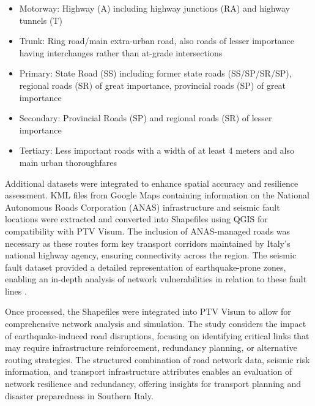 \begin{itemize}
    \item Motorway: Highway (A) including highway junctions (RA) and highway tunnels (T)
    \item Trunk: Ring road/main extra-urban road, also roads of lesser importance having interchanges rather than at-grade intersections
    \item Primary: State Road (SS) including former state roads (SS/SP/SR/SP), regional roads (SR) of great importance, provincial roads (SP) of great importance
    \item Secondary: Provincial Roads (SP) and regional roads (SR) of lesser importance
    \item Tertiary: Less important roads with a width of at least 4 meters and also main urban thoroughfares  
\end{itemize}

Additional datasets were integrated to enhance spatial accuracy and resilience assessment. KML files from Google Maps containing information on the National Autonomous Roads Corporation (ANAS) infrastructure and seismic fault locations were extracted and converted into Shapefiles using QGIS for compatibility with PTV Visum. The inclusion of ANAS-managed roads was necessary as these routes form key transport corridors maintained by Italy’s national highway agency, ensuring connectivity across the region. The seismic fault dataset provided a detailed representation of earthquake-prone zones, enabling an in-depth analysis of network vulnerabilities in relation to these fault lines \cite{Zeng2021}.

Once processed, the Shapefiles were integrated into PTV Visum to allow for comprehensive network analysis and simulation. The study considers the impact of earthquake-induced road disruptions, focusing on identifying critical links that may require infrastructure reinforcement, redundancy planning, or alternative routing strategies. The structured combination of road network data, seismic risk information, and transport infrastructure attributes enables an evaluation of network resilience and redundancy, offering insights for transport planning and disaster preparedness in Southern Italy.

